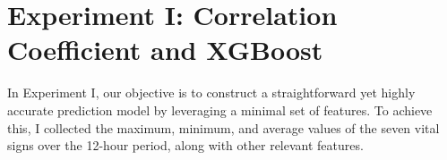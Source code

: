 \documentclass[12pt,a4paper,english
]{tunithesis}
\begin{document}

\section{Experiment I: Correlation Coefficient and XGBoost}

In Experiment I, our objective is to construct a straightforward yet highly accurate prediction model by leveraging a minimal set of features. To achieve this, I collected the maximum, minimum, and average values of the seven vital signs over the 12-hour period, along with other relevant features.
\end{document}
